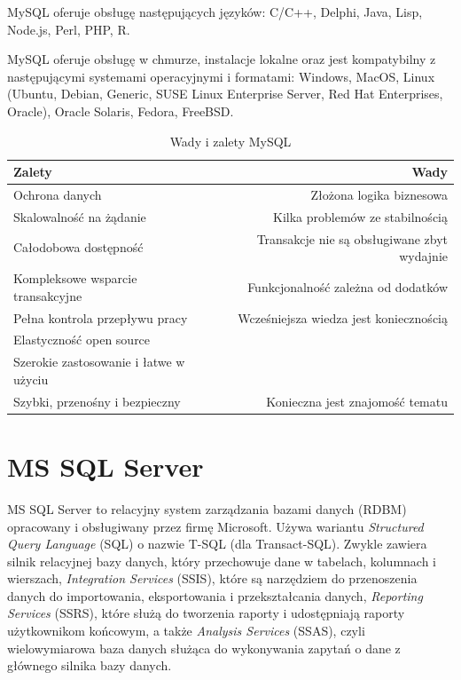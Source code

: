 \documentclass[oneside,polski,logo,indent]{amuthesis}
\begin{document}
\indent MySQL oferuje obsługę następujących języków: C/C++, Delphi, Java, Lisp, Node.js, Perl, PHP, R.


MySQL oferuje obsługę w chmurze, instalacje lokalne oraz jest kompatybilny z następującymi systemami operacyjnymi i formatami: Windows, MacOS, Linux (Ubuntu, Debian, Generic, SUSE Linux Enterprise Server, Red Hat Enterprises, Oracle), Oracle Solaris, Fedora, FreeBSD.

\begin{table}[H]
\caption{Wady i zalety MySQL}
\label{tabela-MySQL}
\centering
\begin{adjustbox}{width=1\textwidth}
\small
\begin{tabular}{lr}
\toprule
Zalety & Wady\\
\midrule
Ochrona danych & Złożona logika biznesowa\\
Skalowalność na żądanie & Kilka problemów ze stabilnością\\
Całodobowa dostępność & Transakcje nie są obsługiwane zbyt wydajnie\\
Kompleksowe wsparcie transakcyjne & Funkcjonalność zależna od dodatków\\
Pełna kontrola przepływu pracy & Wcześniejsza wiedza jest koniecznością\\
Elastyczność open source &\\
Szerokie zastosowanie i łatwe w użyciu &\\
Szybki, przenośny i bezpieczny & Konieczna jest znajomość tematu\\
\bottomrule
\end{tabular}
\end{adjustbox}
\end{table}
\section{MS SQL Server}
MS SQL Server to relacyjny system zarządzania bazami danych (RDBM) opracowany i obsługiwany przez firmę Microsoft. Używa wariantu \emph{Structured Query Language} (SQL) o nazwie T-SQL (dla Transact-SQL). Zwykle zawiera silnik relacyjnej bazy danych, który przechowuje dane w tabelach, kolumnach i wierszach,  \emph{Integration Services} (SSIS), które są narzędziem do przenoszenia danych do importowania, eksportowania i przekształcania danych,  \emph{Reporting Services} (SSRS), które służą do tworzenia raporty i udostępniają raporty użytkownikom końcowym, a także  \emph{Analysis Services} (SSAS), czyli wielowymiarowa baza danych służąca do wykonywania zapytań o dane z głównego silnika bazy danych. 
\end{document}
